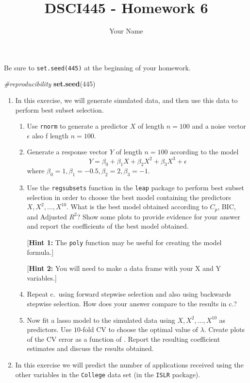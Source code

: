 \documentclass[
]{article}
\title{DSCI445 - Homework 6}
\author{Your Name}
\date{}
\newenvironment{Shaded}{\begin{snugshade}}{\end{snugshade}}
\newcommand{\CommentTok}[1]{\textcolor[rgb]{0.56,0.35,0.01}{\textit{#1}}}
\newcommand{\DecValTok}[1]{\textcolor[rgb]{0.00,0.00,0.81}{#1}}
\newcommand{\FunctionTok}[1]{\textcolor[rgb]{0.13,0.29,0.53}{\textbf{#1}}}
\newcommand{\NormalTok}[1]{#1}
\begin{document}
\maketitle

Be sure to \texttt{set.seed(445)} at the beginning of your homework.

\begin{Shaded}
\begin{Highlighting}[]
\CommentTok{\#reproducibility}
\FunctionTok{set.seed}\NormalTok{(}\DecValTok{445}\NormalTok{)}
\end{Highlighting}
\end{Shaded}

\begin{enumerate}
\def\labelenumi{\arabic{enumi}.}
\item
  In this exercise, we will generate simulated data, and then use this
  data to perform best subset selection.

  \begin{enumerate}
  \def\labelenumii{\alph{enumii})}
  \item
    Use \texttt{rnorm} to generate a predictor \(X\) of length
    \(n = 100\) and a noise vector \(\epsilon\) also f length
    \(n = 100\).
  \item
    Generate a response vector \(Y\) of length \(n = 100\) according to
    the model \[
     Y = \beta_0 + \beta_1 X + \beta_2 X^2 + \beta_3 X^3 + \epsilon
     \] where
    \(\beta_0 = 1, \beta_1 = -0.5, \beta_2 = 2, \beta_3 = -1\).
  \item
    Use the \texttt{regsubsets} function in the \texttt{leap} package to
    perform best subset selection in order to choose the best model
    containing the predictors \(X, X^2, \dots, X^{10}\). What is the
    best model obtained according to \(C_p\), BIC, and Adjusted \(R^2\)?
    Show some plots to provide evidence for your answer and report the
    coefficients of the best model obtained.

    {[}\textbf{Hint 1:} The \texttt{poly} function may be useful for
    creating the model formula.{]}

    {[}\textbf{Hint 2:} You will need to make a data frame with your X
    and Y variables.{]}
  \item
    Repeat c.~using forward stepwise selection and also using backwards
    stepwise selection. How does your answer compare to the results in
    c.?
  \item
    Now fit a lasso model to the simulated data using
    \(X, X^2, \dots, X^{10}\) as predictors. Use \(10\)-fold CV to
    choose the optimal value of \(\lambda\). Create plots of the CV
    error as a function of \lambda. Report the resulting coefficient
    estimates and discuss the results obtained.
  \end{enumerate}
\item
  In this exercise we will predict the number of applications received
  using the other variables in the \texttt{College} data set (in the
  \texttt{ISLR} package).


\end{enumerate}
\end{document}
